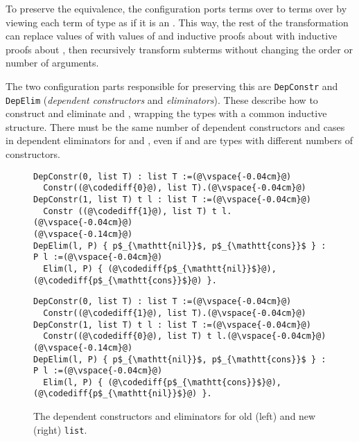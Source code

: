 To preserve the equivalence, the configuration ports terms over \A to terms over \B by viewing each
term of type \B as if it is an \A.
This way, the rest of the transformation can replace values of \A with values of \B and
inductive proofs about \A with inductive proofs about \B, then recursively transform
subterms without changing the order or number of arguments.

The two configuration parts responsible for preserving this are \lstinline{DepConstr}
and \lstinline{DepElim} (\textit{dependent constructors} and \textit{eliminators}).
These describe how to construct and eliminate \A and \B, wrapping the types with a common inductive structure.
There must be the same number of dependent constructors and cases in dependent eliminators for \A and \B,
even if \A and \B are types with different numbers of constructors.

\begin{figure*}
\begin{minipage}{0.48\textwidth}
\begin{lstlisting}
DepConstr(0, list T) : list T :=(@\vspace{-0.04cm}@)
  Constr((@\codediff{0}@), list T).(@\vspace{-0.04cm}@)
DepConstr(1, list T) t l : list T :=(@\vspace{-0.04cm}@)
  Constr ((@\codediff{1}@), list T) t l.(@\vspace{-0.04cm}@)
(@\vspace{-0.14cm}@)
DepElim(l, P) { p$_{\mathtt{nil}}$, p$_{\mathtt{cons}}$ } : P l :=(@\vspace{-0.04cm}@)
  Elim(l, P) { (@\codediff{p$_{\mathtt{nil}}$}@), (@\codediff{p$_{\mathtt{cons}}$}@) }.
\end{lstlisting}
\end{minipage}
\hfill
\begin{minipage}{0.48\textwidth}
\begin{lstlisting}
DepConstr(0, list T) : list T :=(@\vspace{-0.04cm}@)
  Constr((@\codediff{1}@), list T).(@\vspace{-0.04cm}@)
DepConstr(1, list T) t l : list T :=(@\vspace{-0.04cm}@)
  Constr((@\codediff{0}@), list T) t l.(@\vspace{-0.04cm}@)
(@\vspace{-0.14cm}@)
DepElim(l, P) { p$_{\mathtt{nil}}$, p$_{\mathtt{cons}}$ } : P l :=(@\vspace{-0.04cm}@)
  Elim(l, P) { (@\codediff{p$_{\mathtt{cons}}$}@), (@\codediff{p$_{\mathtt{nil}}$}@) }.
\end{lstlisting}
\end{minipage}
\vspace{-0.3cm}
\caption{The dependent constructors and eliminators for old (left) and new (right) \lstinline{list}.}
\label{fig:listconfig}
\end{figure*}

